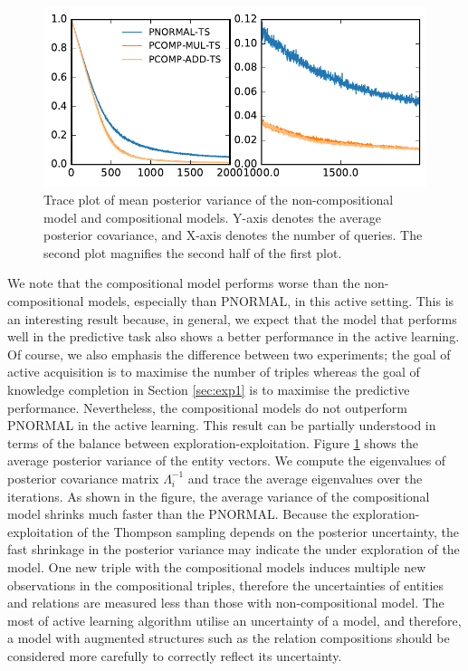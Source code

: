 \begin{figure}[t]
	\centering

	
	\includegraphics[width=0.9\linewidth]{images/posterior_variance_trace_kinship.pdf}

	\caption{\label{fig:pos_var} Trace plot of mean posterior variance of the non-compositional model and compositional models. Y-axis denotes the average posterior covariance, and X-axis denotes the number of queries. The second plot magnifies the second half of the first plot.}
\end{figure}

We note that the compositional model performs worse than the non-compositional models,
especially than PNORMAL, in this active setting. This is an interesting result because, 
in general, we expect that the model that performs well in the predictive task also shows 
a better performance in the active learning. 
Of course, we also emphasis the difference between two experiments; 
the goal of active acquisition is to maximise the number of triples 
whereas the goal of knowledge completion in Section \ref{sec:exp1} is to maximise 
the predictive performance. Nevertheless, the compositional models do not outperform 
PNORMAL in the active learning.
This result can be partially understood in terms of the balance between 
exploration-exploitation. Figure \ref{fig:pos_var} shows the average posterior variance of 
the entity vectors. We compute the eigenvalues of posterior covariance matrix $\Lambda_i^{-1}$ 
and trace the average eigenvalues over the iterations. 
As shown in the figure, the average variance of the compositional model shrinks much faster 
than the PNORMAL. Because the exploration-exploitation of the Thompson sampling depends on the
posterior uncertainty, the fast shrinkage in the posterior variance may indicate the under 
exploration of the model. One new triple with the compositional models induces multiple new 
observations in the compositional triples, therefore the uncertainties of entities and 
relations are measured less than those with non-compositional model. The most of active 
learning algorithm utilise an uncertainty of a model, and therefore, a model with augmented 
structures such as the relation compositions should be considered more carefully to correctly 
reflect its uncertainty.

